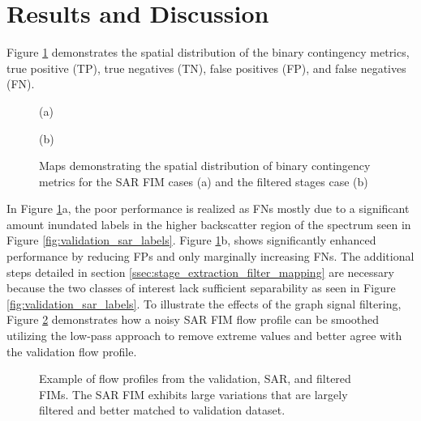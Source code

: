 \documentclass{article}
\begin{document}
\section{Results and Discussion}
\label{sec:results_and_discussion}
%
Figure \ref{fig:contingency_maps} demonstrates the spatial distribution of the binary contingency metrics, true positive (TP), true negatives (TN), false positives (FP), and false negatives (FN).
% 
\begin{figure}[htb]
    \begin{minipage}[b]{.48\linewidth}
        \centering
        \centerline{}
        \centerline{(a)}\medskip
    \end{minipage}
    \hfill
    \begin{minipage}[b]{0.48\linewidth}
        \centering
        \centerline{}
        \centerline{(b)}\medskip
    \end{minipage}
    \caption{Maps demonstrating the spatial distribution of binary contingency metrics for the SAR FIM cases (a) and the filtered stages case (b)}
    \label{fig:contingency_maps}
\end{figure}
%
In Figure \ref{fig:contingency_maps}a, the poor performance is realized as FNs mostly due to a significant amount inundated labels in the higher backscatter region of the spectrum seen in Figure \ref{fig:validation_sar_labels}.
Figure \ref{fig:contingency_maps}b, shows significantly enhanced performance by reducing FPs and only marginally increasing FNs.
The additional steps detailed in section \ref{ssec:stage_extraction_filter_mapping} are necessary because the two classes of interest lack sufficient separability as seen in Figure \ref{fig:validation_sar_labels}.
To illustrate the effects of the graph signal filtering, Figure \ref{fig:flow_profile} demonstrates how a noisy SAR FIM flow profile can be smoothed utilizing the low-pass approach to remove extreme values and better agree with the validation flow profile.
%
\begin{figure}[htb]
    \begin{minipage}[b]{1.0\linewidth}
        \centering
        \centerline{}
    \end{minipage}
    \caption{Example of flow profiles from the validation, SAR, and filtered FIMs. The SAR FIM exhibits large variations that are largely filtered and better matched to validation dataset.}
    \label{fig:flow_profile}
\end{figure}
%
\end{document}
